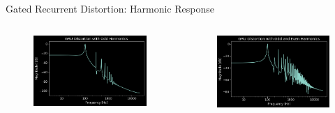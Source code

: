 \begin{frame}{Gated Recurrent Distortion: Harmonic Response}
    \begin{columns}
        \begin{column}{0.5\linewidth}
            \begin{figure}
                \centering
                \includegraphics[width=2.75in]{../GatedRecurrentDistortion/Pics/odd_harm}
            \end{figure}
        \end{column}
        \begin{column}{0.5\linewidth}
            \begin{figure}
                \centering
                \includegraphics[width=2.75in]{../GatedRecurrentDistortion/Pics/all_harm}
            \end{figure}
        \end{column}
    \end{columns}
\end{frame}

